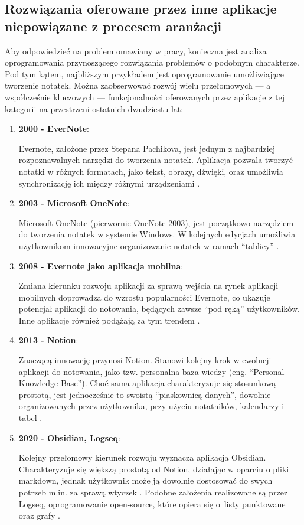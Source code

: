 \subsection{Rozwiązania oferowane przez inne aplikacje niepowiązane z procesem aranżacji}
Aby odpowiedzieć na problem omawiany w pracy, konieczna jest analiza oprogramowania przynoszącego rozwiązania problemów
o podobnym charakterze. Pod tym kątem, najbliższym przykładem jest oprogramowanie umożliwiające
tworzenie notatek. Można zaobserwować rozwój wielu przełomowych — a współcześnie kluczowych — funkcjonalności oferowanych
przez aplikacje z tej kategorii na przestrzeni ostatnich dwudziestu lat:
\begin{enumerate}
	\item \textbf{2000 - EverNote}:

	      Evernote, założone przez Stepana Pachikova, jest jednym z najbardziej rozpoznawalnych narzędzi do tworzenia
	      notatek. Aplikacja pozwala tworzyć notatki w różnych formatach, jako tekst, obrazy, dźwięki,
	      oraz umożliwia synchronizację ich między różnymi urządzeniami \cite{evernote}.
	\item \textbf{2003 - Microsoft OneNote}:

	      Microsoft OneNote (pierwornie OneNote 2003), jest początkowo narzędziem do tworzenia notatek w systemie
	      Windows. W kolejnych edycjach umożliwia użytkownikom innowacyjne organizowanie notatek w ramach \enquote{tablicy} \cite{onenote}.
	\item \textbf{2008 - Evernote jako aplikacja mobilna}:

	      Zmiana kierunku rozwoju aplikacji za sprawą wejścia na rynek aplikacji mobilnych doprowadza do wzrostu
	      popularności Evernote,
	      co ukazuje potencjał aplikacji do notowania, będących zawsze \enquote{pod ręką} użytkowników.
	      Inne aplikacje również podążają za tym trendem \cite{evernote}.
	\item \textbf{2013 - Notion}:

	      Znaczącą innowację przynosi Notion. Stanowi kolejny krok w ewolucji aplikacji do notowania, jako tzw. personalna
	      baza wiedzy (eng. \enquote{Personal Knowledge Base}).
	      Choć sama aplikacja charakteryzuje się stosunkową prostotą, jest jednocześnie to swoistą \enquote{piaskownicą danych},
	      dowolnie organizowanych przez użytkownika, przy użyciu notatników, kalendarzy i tabel \cite{notion}.
	\item \textbf{2020 - Obsidian, Logseq}:

	      Kolejny przełomowy kierunek rozwoju wyznacza aplikacja Obsidian. Charakteryzuje się większą prostotą od Notion,
	      działając w oparciu o pliki markdown, jednak użytkownik może ją dowolnie dostosować do swych potrzeb m.in.
	      za sprawą wtyczek \cite{obsidian}.
	      Podobne założenia realizowane są przez Logseq,
	      oprogramowanie open-source, które opiera się o~listy punktowane oraz grafy \cite{logseq}.
\end{enumerate}
